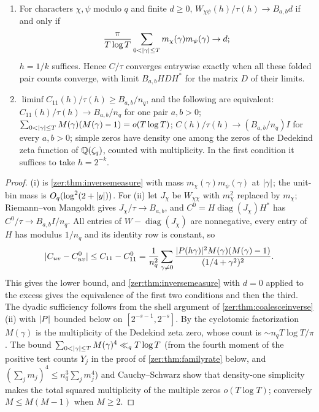 \begin{theorem}\label{zer:thm:identityclass}
\begin{enumerate}[label=\textup{(\roman*)}]
\item For characters $\chi,\psi$ modulo $q$ and finite $d\ge0$, $W_{\chi\psi}(h)/\tau(h)\to B_{a,b}d$ if and only
if
\[
 \frac\pi{T\log T}\sum_{0<\lvert\gamma\rvert\le T}m_\chi(\gamma)m_\psi(\gamma)\to d ;
\]
$h=1/k$ suffices. Hence $C/\tau$
converges entrywise exactly when all these folded pair counts converge, with limit $B_{a,b}HDH^*$ for
the matrix $D$ of their limits.
\item $\liminf C_{11}(h)/\tau(h)\ge B_{a,b}/n_q$, and the following are equivalent:
$C_{11}(h)/\tau(h)\to B_{a,b}/n_q$ for one pair $a,b>0$; $\sum_{0<\lvert\gamma\rvert\le T}M(\gamma)(M(\gamma)-1)=o(T\log T)$;
$C(h)/\tau(h)\to(B_{a,b}/n_q)I$ for every $a,b>0$; simple zeros have density one among the zeros of the
Dedekind zeta function of $\mathbb{Q}(\zeta_q)$, counted with multiplicity. In the first condition it suffices
to take $h=2^{-k}$.
\end{enumerate}
\end{theorem}
\begin{proof}
(i) is \cref{zer:thm:inversemeasure} with mass $m_\chi(\gamma)m_\psi(\gamma)$ at $\lvert\gamma\rvert$; the unit-bin mass is
$O_q(\log^2(2+\lvert y\rvert))$. For (ii) let $J_\chi$ be $W_{\chi\chi}$ with $m_\chi^2$ replaced by $m_\chi$;
Riemann--von Mangoldt gives $J_\chi/\tau\to B_{a,b}$, and $C^0=H\operatorname{diag}(J_\chi)H^*$ has
$C^0/\tau\to B_{a,b}I/n_q$. All entries of $W-\operatorname{diag}(J_\chi)$ are nonnegative, every entry of $H$
has modulus $1/n_q$ and its identity row is constant, so
\[
 \lvert C_{uv}-C^0_{uv}\rvert\le C_{11}-C^0_{11}=\frac1{n_q^2}\sum_{\gamma\ne0}\frac{\lvert P(h\gamma)\rvert^2M(\gamma)(M(\gamma)-1)}{(1/4+\gamma^2)^2}.
\]
This gives the lower bound, and \cref{zer:thm:inversemeasure} with $d=0$ applied to the excess gives the
equivalence of the first two conditions and then the third. The dyadic sufficiency follows from the
shell argument of \cref{zer:thm:coalesceinverse}(ii) with $\lvert P\rvert$ bounded below on
$[2^{-s-1},2^{-s}]$. By the cyclotomic factorization $M(\gamma)$ is the multiplicity of the Dedekind zeta
zero, whose count is $\sim n_qT\log T/\pi$. The bound $\sum_{0<\lvert\gamma\rvert\le T}M(\gamma)^4\ll_qT\log T$ (from the
fourth moment of the positive test counts $Y_j$ in the proof of \cref{zer:thm:familyrate} below, and
$(\sum_jm_j)^4\le n_q^3\sum_jm_j^4$) and Cauchy--Schwarz show that density-one simplicity makes the
total squared multiplicity of the multiple zeros $o(T\log T)$; conversely $M\le M(M-1)$ when $M\ge2$.
\end{proof}

